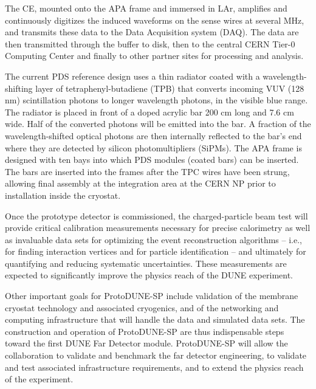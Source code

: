 The CE, mounted onto the APA frame and immersed in LAr, amplifies and continuously digitizes the induced waveforms on the sense wires at several MHz, and transmits these data to the Data Acquisition system (DAQ). The data are then transmitted through the buffer to disk, then to the central CERN Tier-0 Computing Center and finally to other partner sites for processing and analysis.  

The current PDS reference design uses a thin radiator coated with a wavelength-shifting layer of tetraphenyl-butadiene (TPB) that converts incoming VUV (128 nm) %
scintillation photons to longer wavelength photons, in the visible blue range. 
 The radiator is placed in front of a doped acrylic bar 200 cm long and 7.6 cm wide. Half of the converted photons will be emitted into the bar. A fraction of the wavelength-shifted optical photons are then internally reflected to the bar's end where they are detected by silicon photomultipliers (SiPMs).
The APA frame is designed with ten bays into which PDS modules (coated bars) can be inserted. The bars are inserted into the frames after the TPC wires have been strung, allowing final assembly at the integration area at the CERN NP prior to installation inside the cryostat. 

Once the prototype detector is commissioned, the charged-particle beam test will provide critical calibration measurements necessary for precise calorimetry as well as invaluable data sets for optimizing the event reconstruction algorithms -- i.e., for finding interaction vertices and for particle identification -- and ultimately for quantifying and reducing systematic uncertainties. These measurements are expected to significantly improve the physics reach of the DUNE experiment.

Other important goals for ProtoDUNE-SP include validation of the membrane cryostat technology and associated cryogenics, and of the networking and computing infrastructure that will handle the data and simulated data sets.
The construction and operation of ProtoDUNE-SP are thus indispensable steps toward the first DUNE Far Detector module. ProtoDUNE-SP will allow the collaboration to validate and benchmark the far detector engineering, to validate and test associated infrastructure requirements, and to extend the physics reach of the experiment. 


